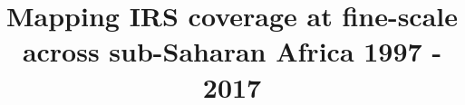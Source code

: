 \documentclass{bmcart}
\begin{document}
\begin{frontmatter}

\begin{fmbox}


\title{Mapping IRS coverage at fine-scale across sub-Saharan Africa 1997 - 2017}


\author[
   addressref={aff1},                   %
   corref={aff1},                       %
   email={anita.nandi@bdi.ox.ac.uk}   %
]{ }
\author[
   addressref={aff1}
]{ }
\author[
   addressref={aff1}
]{ }
\author[
   addressref={aff1}
]{ }
\author[
   addressref={aff1}
]{ }
\author[
   addressref={aff1}
]{ }
\author[
   addressref={aff1}
]{ }
\author[
   addressref={aff1}
]{ }
\author[
   addressref={aff1}
]{ }
\author[
   addressref={aff1}
]{ }
\author[
   addressref={aff1}
]{ }
\author[
   addressref={aff1}
]{ }
\author[
   addressref={aff1}
]{ }
\author[
   addressref={aff1}
]{ }
\author[
   addressref={aff1}
]{ }
\author[
   addressref={aff1}
]{ }
\author[
   addressref={aff1}
]{ }
\author[
   addressref={aff1}
]{ }




\end{fmbox}
\end{frontmatter}
\end{document}
